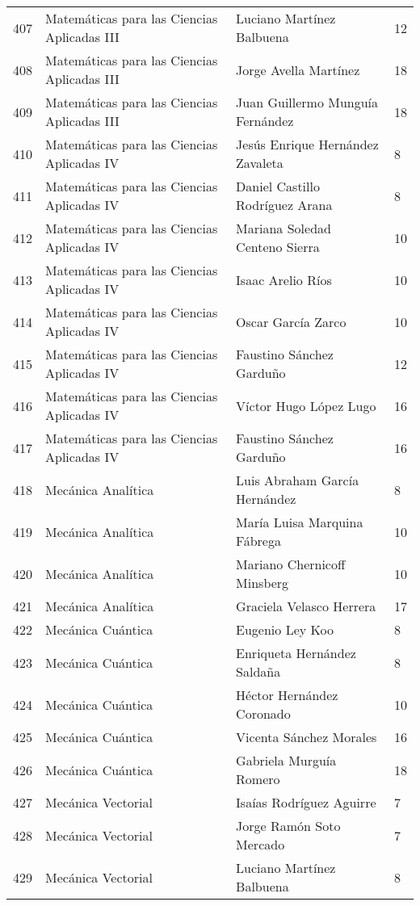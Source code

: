 \begin{table}[ht]
\begin{tabular}{rlll}
  407 & Matemáticas para las Ciencias Aplicadas III & Luciano Martínez Balbuena & 12 \\ 
  408 & Matemáticas para las Ciencias Aplicadas III & Jorge Avella Martínez & 18 \\ 
  409 & Matemáticas para las Ciencias Aplicadas III & Juan Guillermo Munguía Fernández & 18 \\ 
  410 & Matemáticas para las Ciencias Aplicadas IV & Jesús Enrique Hernández Zavaleta & 8 \\ 
  411 & Matemáticas para las Ciencias Aplicadas IV & Daniel Castillo Rodríguez Arana & 8 \\ 
  412 & Matemáticas para las Ciencias Aplicadas IV & Mariana Soledad Centeno Sierra & 10 \\ 
  413 & Matemáticas para las Ciencias Aplicadas IV & Isaac Arelio Ríos & 10 \\ 
  414 & Matemáticas para las Ciencias Aplicadas IV & Oscar García Zarco & 10 \\ 
  415 & Matemáticas para las Ciencias Aplicadas IV & Faustino Sánchez Garduño & 12 \\ 
  416 & Matemáticas para las Ciencias Aplicadas IV & Víctor Hugo López Lugo & 16 \\ 
  417 & Matemáticas para las Ciencias Aplicadas IV & Faustino Sánchez Garduño & 16 \\ 
  418 & Mecánica Analítica & Luis Abraham García Hernández & 8 \\ 
  419 & Mecánica Analítica & María Luisa Marquina Fábrega & 10 \\ 
  420 & Mecánica Analítica & Mariano Chernicoff Minsberg & 10 \\ 
  421 & Mecánica Analítica & Graciela Velasco Herrera & 17 \\ 
  422 & Mecánica Cuántica & Eugenio Ley Koo & 8 \\ 
  423 & Mecánica Cuántica & Enriqueta Hernández Saldaña & 8 \\ 
  424 & Mecánica Cuántica & Héctor Hernández Coronado & 10 \\ 
  425 & Mecánica Cuántica & Vicenta Sánchez Morales & 16 \\ 
  426 & Mecánica Cuántica & Gabriela Murguía Romero & 18 \\ 
  427 & Mecánica Vectorial & Isaías Rodríguez Aguirre & 7 \\ 
  428 & Mecánica Vectorial & Jorge Ramón Soto Mercado & 7 \\ 
  429 & Mecánica Vectorial & Luciano Martínez Balbuena & 8 \\ 

\end{tabular}
\end{table}
